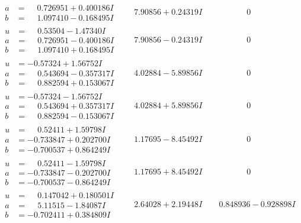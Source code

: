 \documentclass[1p]{elsarticle_modified}
\theoremstyle{definition}
\begin{document}
$$\begin{array}{c|c|c}
\begin{aligned}
a &= \phantom{-}0.726951 + 0.400186 I \\
b &= \phantom{-}1.097410 - 0.168495 I\end{aligned}
 & \phantom{-}7.90856 + 0.24319 I & \phantom{-0.000000 } 0 \\ \hline\begin{aligned}
u &= \phantom{-}0.53504 - 1.47340 I \\
a &= \phantom{-}0.726951 - 0.400186 I \\
b &= \phantom{-}1.097410 + 0.168495 I\end{aligned}
 & \phantom{-}7.90856 - 0.24319 I & \phantom{-0.000000 } 0 \\ \hline\begin{aligned}
u &= -0.57324 + 1.56752 I \\
a &= \phantom{-}0.543694 - 0.357317 I \\
b &= \phantom{-}0.882594 + 0.153067 I\end{aligned}
 & \phantom{-}4.02884 - 5.89856 I & \phantom{-0.000000 } 0 \\ \hline\begin{aligned}
u &= -0.57324 - 1.56752 I \\
a &= \phantom{-}0.543694 + 0.357317 I \\
b &= \phantom{-}0.882594 - 0.153067 I\end{aligned}
 & \phantom{-}4.02884 + 5.89856 I & \phantom{-0.000000 } 0 \\ \hline\begin{aligned}
u &= \phantom{-}0.52411 + 1.59798 I \\
a &= -0.733847 + 0.202700 I \\
b &= -0.700537 + 0.864249 I\end{aligned}
 & \phantom{-}1.17695 - 8.45492 I & \phantom{-0.000000 } 0 \\ \hline\begin{aligned}
u &= \phantom{-}0.52411 - 1.59798 I \\
a &= -0.733847 - 0.202700 I \\
b &= -0.700537 - 0.864249 I\end{aligned}
 & \phantom{-}1.17695 + 8.45492 I & \phantom{-0.000000 } 0 \\ \hline\begin{aligned}
u &= \phantom{-}0.147042 + 0.180501 I \\
a &= \phantom{-}5.11515 - 1.84087 I \\
b &= -0.702411 + 0.384809 I\end{aligned}
 & \phantom{-}2.64028 + 2.19448 I & \phantom{-}0.848936 - 0.928898 I \\ \hline\begin{aligned}

\end{aligned}
\end{array}$$
\end{document}
